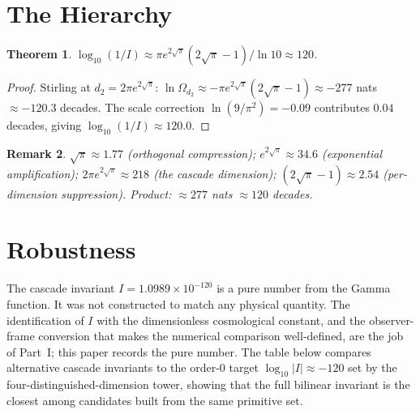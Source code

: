 \documentclass[11pt,a4paper]{article}
\newtheorem{theorem}{Theorem}[section]
\newtheorem{remark}[theorem]{Remark}
\begin{document}
\section{The Hierarchy}\label{sec:the-hierarchy}

\begin{theorem}\label{thm:hierarchy}
$\log_{10}(1/I)\approx
\pi e^{2\sqrt{\pi}}(2\sqrt{\pi}-1)/\ln 10\approx 120$.
\end{theorem}

\begin{proof}
Stirling at $d_2 = 2\pi e^{2\sqrt{\pi}}$:
$\ln\Omega_{d_2}\approx -\pi e^{2\sqrt{\pi}}(2\sqrt{\pi}-1)
\approx -277$ nats $\approx -120.3$ decades. The scale correction
$\ln(9/\pi^2) = -0.09$ contributes $0.04$ decades, giving
$\log_{10}(1/I) \approx 120.0$.
\end{proof}

\begin{remark}
$\sqrt{\pi}\approx 1.77$ (orthogonal compression);\;
$e^{2\sqrt{\pi}}\approx 34.6$ (exponential amplification);\;
$2\pi e^{2\sqrt{\pi}}\approx 218$ (the cascade dimension);\;
$(2\sqrt{\pi}-1)\approx 2.54$ (per-dimension suppression).\;
Product: $\approx 277$ nats $\approx 120$ decades.
\end{remark}

\section{Robustness}\label{sec:robustness}

The cascade invariant $I = 1.0989\times 10^{-120}$ is a pure number from
the Gamma function. It was not constructed to match any physical quantity.
The identification of $I$ with the dimensionless cosmological constant,
and the observer-frame conversion that makes the numerical comparison
well-defined, are the job of Part~I; this paper records the pure number.
The table below compares alternative cascade invariants to the order-0
target $\log_{10}|I|\approx -120$ set by the four-distinguished-dimension
tower, showing that the full bilinear invariant is the closest among
candidates built from the same primitive set.
\end{document}
